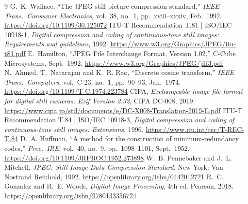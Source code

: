 \documentclass[11pt,a4paper]{article}
\begin{document}
{\small
\begin{thebibliography}{9}
 G.~K. Wallace, ``The JPEG still picture compression
  standard,'' \emph{IEEE Trans.\ Consumer Electronics}, vol.~38, no.~1,
  pp.~xviii--xxxiv, Feb.\ 1992. \url{https://doi.org/10.1109/30.125072}
 ITU-T Recommendation T.81 | ISO/IEC 10918-1, \emph{Digital
  compression and coding of continuous-tone still images: Requirements and
  guidelines}, 1992. \url{https://www.w3.org/Graphics/JPEG/itu-t81.pdf}
 E.~Hamilton, ``JPEG File Interchange Format, Version 1.02,''
  C-Cube Microsystems, Sept.\ 1992. \url{https://www.w3.org/Graphics/JPEG/jfif3.pdf}
 N.~Ahmed, T.~Natarajan and K.~R. Rao, ``Discrete cosine
  transform,'' \emph{IEEE Trans.\ Computers}, vol.~C-23, no.~1, pp.~90--93,
  Jan.\ 1974. \url{https://doi.org/10.1109/T-C.1974.223784}
 CIPA, \emph{Exchangeable image file format for digital still
  cameras: Exif Version 2.32}, CIPA DC-008, 2019. \url{https://www.cipa.jp/std/documents/e/DC-X008-Translation-2019-E.pdf}
 ITU-T Recommendation T.84 | ISO/IEC 10918-3, \emph{Digital
  compression and coding of continuous-tone still images: Extensions}, 1996. \url{https://www.itu.int/rec/T-REC-T.84}
 D.~A. Huffman, ``A method for the construction of
  minimum-redundancy codes,'' \emph{Proc.\ IRE}, vol.~40, no.~9,
  pp.~1098--1101, Sept.\ 1952. \url{https://doi.org/10.1109/JRPROC.1952.273898}
 W.~B. Pennebaker and J.~L. Mitchell, \emph{JPEG:
  Still Image Data Compression Standard}. New York: Van Nostrand Reinhold,
  1992. \url{https://openlibrary.org/isbn/0442012721}
 R.~C. Gonzalez and R.~E. Woods, \emph{Digital Image
  Processing}, 4th ed. Pearson, 2018. \url{https://openlibrary.org/isbn/9780133356724}
\end{thebibliography}
}
\end{document}
